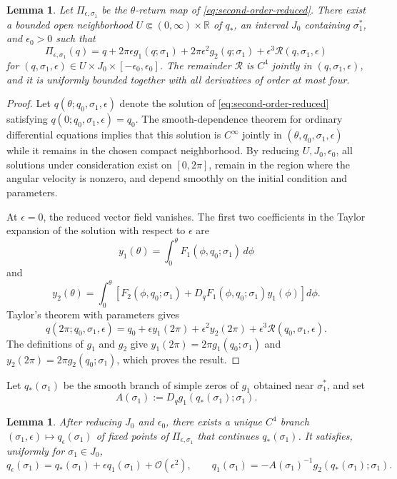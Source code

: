 \documentclass[11pt]{amsart}
\newtheorem{lemma}[theorem]{Lemma}
\theoremstyle{remark}
\newcommand{\R}{\mathbb{R}}
\newcommand{\cO}{\mathcal{O}}
\begin{document}
\begin{lemma}\label{lem:return-map-expansion}
Let \(\Pi_{\epsilon,\sigma_1}\) be the \(\theta\)-return map of
\eqref{eq:second-order-reduced}.  There exist a bounded open neighborhood
\(U\Subset(0,\infty)\times\R\) of \(q_*\), an interval \(J_0\) containing
\(\sigma_1^*\), and \(\epsilon_0>0\) such that
\begin{equation}\label{eq:return-map-expansion}
\Pi_{\epsilon,\sigma_1}(q)
=q+2\pi\epsilon g_1(q;\sigma_1)
+2\pi\epsilon^2g_2(q;\sigma_1)
+\epsilon^3\mathcal{R}(q,\sigma_1,\epsilon)
\end{equation}
for \((q,\sigma_1,\epsilon)\in U\times J_0\times[-\epsilon_0,\epsilon_0]\).
The remainder \(\mathcal{R}\) is \(C^4\) jointly in
\((q,\sigma_1,\epsilon)\), and it is uniformly bounded together with all
derivatives of order at most four.
\end{lemma}

\begin{proof}
Let \(q(\theta;q_0,\sigma_1,\epsilon)\) denote the solution of
\eqref{eq:second-order-reduced} satisfying
\(q(0;q_0,\sigma_1,\epsilon)=q_0\).  The smooth-dependence theorem for
ordinary differential equations implies that this solution is \(C^\infty\)
jointly in \((\theta,q_0,\sigma_1,\epsilon)\) while it remains in the chosen
compact neighborhood.  By reducing \(U,J_0,\epsilon_0\), all solutions under
consideration exist on \([0,2\pi]\), remain in the region where the angular
velocity is nonzero, and depend smoothly on the initial condition and
parameters.

At \(\epsilon=0\), the reduced vector field vanishes.  The first two
coefficients in the Taylor expansion of the solution with respect to
\(\epsilon\) are
\[
 y_1(\theta)=\int_0^\theta F_1(\phi,q_0;\sigma_1)\,d\phi
\]
and
\[
 y_2(\theta)=\int_0^\theta
\left[
F_2(\phi,q_0;\sigma_1)
+D_qF_1(\phi,q_0;\sigma_1)y_1(\phi)
\right]d\phi.
\]
Taylor's theorem with parameters gives
\[
 q(2\pi;q_0,\sigma_1,\epsilon)
=q_0+\epsilon y_1(2\pi)+\epsilon^2y_2(2\pi)
+\epsilon^3\mathcal{R}(q_0,\sigma_1,\epsilon).
\]
The definitions of \(g_1\) and \(g_2\) give
\(y_1(2\pi)=2\pi g_1(q_0;\sigma_1)\) and
\(y_2(2\pi)=2\pi g_2(q_0;\sigma_1)\), which proves the result.
\end{proof}

Let \(q_*(\sigma_1)\) be the smooth branch of simple zeros of \(g_1\)
obtained near \(\sigma_1^*\), and set
\[
 A(\sigma_1):=D_qg_1(q_*(\sigma_1);\sigma_1).
\]

\begin{lemma}\label{lem:fixed-point-branch}
After reducing \(J_0\) and \(\epsilon_0\), there exists a unique \(C^4\)
branch \((\sigma_1,\epsilon)\mapsto q_\epsilon(\sigma_1)\) of fixed points
of \(\Pi_{\epsilon,\sigma_1}\) that continues \(q_*(\sigma_1)\).  It
satisfies, uniformly for \(\sigma_1\in J_0\),
\begin{equation}\label{eq:fixed-point-expansion}
q_\epsilon(\sigma_1)
=q_*(\sigma_1)+\epsilon q_1(\sigma_1)+\cO(\epsilon^2),
\qquad
q_1(\sigma_1)
=-A(\sigma_1)^{-1}g_2(q_*(\sigma_1);\sigma_1).
\end{equation}
\end{lemma}
\end{document}
